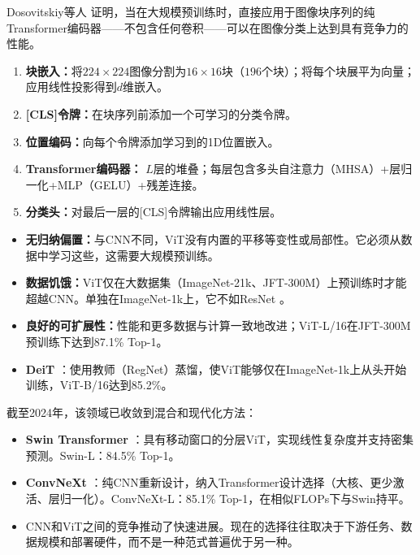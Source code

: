 Dosovitskiy等人 \cite{dosovitskiy2020image}证明，当在大规模预训练时，直接应用于图像块序列的纯Transformer编码器——不包含任何卷积——可以在图像分类上达到具有竞争力的性能。

\begin{architecture}[ViT架构]
\begin{enumerate}
    \item \textbf{块嵌入：}将$224\times224$图像分割为$16\times16$块（$196$个块）；将每个块展平为向量；应用线性投影得到$d$维嵌入。
    \item \textbf{[CLS]令牌：}在块序列前添加一个可学习的分类令牌。
    \item \textbf{位置编码：}向每个令牌添加学习到的1D位置嵌入。
    \item \textbf{Transformer编码器：} $L$层的堆叠；每层包含多头自注意力（MHSA）+层归一化+MLP（GELU）+残差连接。
    \item \textbf{分类头：}对最后一层的[CLS]令牌输出应用线性层。
\end{enumerate}
\end{architecture}

\begin{properties}[ViT关键洞察]
\begin{itemize}
    \item \textbf{无归纳偏置：}与CNN不同，ViT没有内置的平移等变性或局部性。它必须从数据中学习这些，这需要大规模预训练。
    \item \textbf{数据饥饿：}ViT仅在大数据集（ImageNet-21k、JFT-300M）上预训练时才能超越CNN。单独在ImageNet-1k上，它不如ResNet \cite{dosovitskiy2020image}。
    \item \textbf{良好的可扩展性：}性能和更多数据与计算一致地改进；ViT-L/16在JFT-300M预训练下达到87.1\% Top-1。
    \item \textbf{DeiT} \cite{touvron2021training}：使用教师（RegNet）蒸馏，使ViT能够仅在ImageNet-1k上从头开始训练，ViT-B/16达到85.2\%。
\end{itemize}
\end{properties}

\begin{note}
截至2024年，该领域已收敛到混合和现代化方法：
\begin{itemize}
    \item \textbf{Swin Transformer} \cite{liu2021swin}：具有移动窗口的分层ViT，实现线性复杂度并支持密集预测。Swin-L：84.5\% Top-1。
    \item \textbf{ConvNeXt} \cite{liu2022convnet}：纯CNN重新设计，纳入Transformer设计选择（大核、更少激活、层归一化）。ConvNeXt-L：85.1\% Top-1，在相似FLOPs下与Swin持平。
    \item CNN和ViT之间的竞争推动了快速进展。现在的选择往往取决于下游任务、数据规模和部署硬件，而不是一种范式普遍优于另一种。
\end{itemize}
\end{note}

